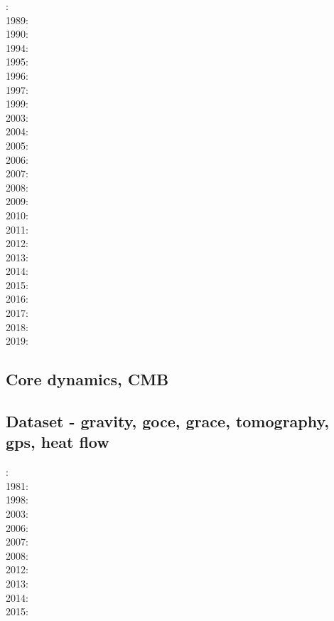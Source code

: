 : \cite{yusa84}\\
1989: \cite{blbc89}\\
1990: \cite{trab90}\\
1994: \cite{brsa94}\\
1995: \cite{brsa95}\cite{moso95}\\
1996: \cite{zhon96}\cite{mozg96}\\
1997: \cite{rist97}\\
1999: \cite{lind99}\\
2003: \cite{taki03}\cite{modm03}\\
2004: \cite{kaps04}\cite{kasa04}\cite{kaks08}\\
2005: \cite{mure05}\\
2006: \cite{kapo06}\cite{more06}\\
2007: \cite{toma07}\cite{chcc07}\cite{kabe07}\cite{kaks07}\cite{moql07}\\
2008: \cite{zhmt08}\cite{deka08}\cite{trub08}\cite{krdp08}\\
2009: \cite{king09}\\
2010: \cite{kaus10}\cite{kamm10}\\
2011: \cite{dumg11}\cite{uibb11}\\
2012: \cite{crsg12}\cite{chgv12}\cite{krwd12}\cite{may12}\\
2013: \cite{chtl13}\cite{kemk13}\\
2014: \cite{thmk14}\\
2015: \cite{lelk15}\cite{rumi15}\cite{chpe15}\\
2016: \cite{dumy16}\cite{blmp16}\\
2017: \cite{robh17}\cite{wisv17}\\
2018: \cite{memm18}\\
2019: \cite{clhe19}

\subsection*{Core dynamics, CMB}

\cite{hayu96}
\cite{lahb08}

\subsection*{Dataset - gravity, goce, grace, tomography, gps, heat flow}

: \cite{rola77}\\
1981: \cite{dzan81}\\
1998: \cite{bisp98}\\
2003: \cite{krhh03}\cite{sosi03}\\
2006: \cite{masr06}\\
2007: \cite{mitk07}\\
2008: \cite{zhou08}\cite{zhou08}\\
2012: \cite{hawj12}\cite{resa12}\cite{hawj12}\\
2013: \cite{ress13}\cite{ebbf13}\cite{davi13}\\
2014: \cite{paml14}\cite{ebbf14}\cite{krbk14}\\
2015: \cite{boem15}


